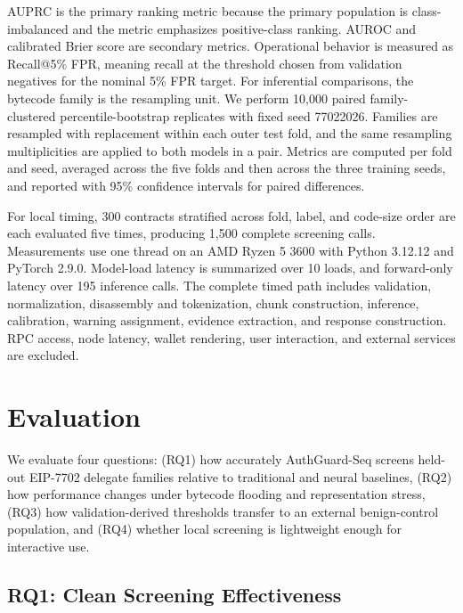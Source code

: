 \documentclass[conference]{IEEEtran}
\begin{document}
AUPRC is the primary ranking metric because the primary population is class-imbalanced and the metric emphasizes positive-class ranking. AUROC and calibrated Brier score are secondary metrics. Operational behavior is measured as Recall@5\% FPR, meaning recall at the threshold chosen from validation negatives for the nominal 5\% FPR target. For inferential comparisons, the bytecode family is the resampling unit. We perform 10,000 paired family-clustered percentile-bootstrap replicates with fixed seed 77022026. Families are resampled with replacement within each outer test fold, and the same resampling multiplicities are applied to both models in a pair. Metrics are computed per fold and seed, averaged across the five folds and then across the three training seeds, and reported with 95\% confidence intervals for paired differences.

For local timing, 300 contracts stratified across fold, label, and code-size order are each evaluated five times, producing 1,500 complete screening calls. Measurements use one thread on an AMD Ryzen 5 3600 with Python 3.12.12 and PyTorch 2.9.0. Model-load latency is summarized over 10 loads, and forward-only latency over 195 inference calls. The complete timed path includes validation, normalization, disassembly and tokenization, chunk construction, inference, calibration, warning assignment, evidence extraction, and response construction. RPC access, node latency, wallet rendering, user interaction, and external services are excluded.







\section{Evaluation}
\label{sec:evaluation}

We evaluate four questions: (RQ1) how accurately AuthGuard-Seq screens held-out EIP-7702 delegate families relative to traditional and neural baselines, (RQ2) how performance changes under bytecode flooding and representation stress, (RQ3) how validation-derived thresholds transfer to an external benign-control population, and (RQ4) whether local screening is lightweight enough for interactive use.

\subsection{RQ1: Clean Screening Effectiveness}
\end{document}
